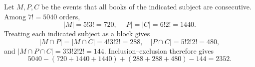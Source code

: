 Let $M,P,C$ be the events that all books of the indicated subject are consecutive. Among $7!=5040$ orders,
\[
|M|=5!3!=720,\quad |P|=|C|=6!2!=1440.
\]
Treating each indicated subject as a block gives
\[
|M\cap P|=|M\cap C|=4!3!2!=288,\quad |P\cap C|=5!2!2!=480,
\]
and $|M\cap P\cap C|=3!3!2!2!=144$. Inclusion--exclusion therefore gives
\[
5040-(720+1440+1440)+(288+288+480)-144=\boxed{2352}.
\]
